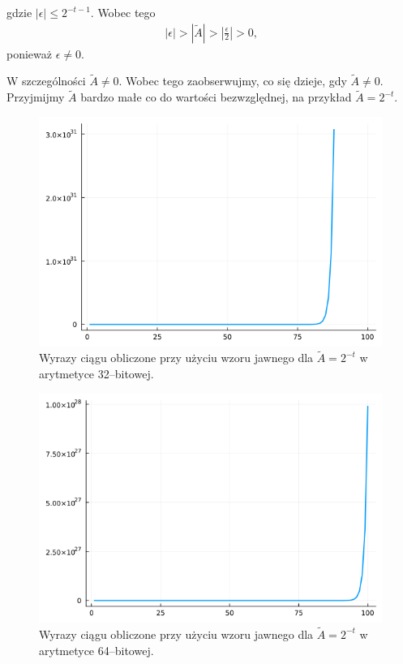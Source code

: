 \documentclass{article}
\begin{document}
\noindent gdzie \(|\epsilon| \leq 2^{-t-1}\). Wobec tego 
\begin{align*}
    \left| \epsilon \right| > \left| \tilde{A} \right|  > \left| \frac{\epsilon}{2} \right| > 0 \text{,}
\end{align*}
ponieważ \(\epsilon \neq 0 \).

\noindent W szczególności \(\tilde{A} \neq 0\). Wobec tego zaobserwujmy, co się dzieje, gdy \(\tilde{A} \neq 0\). Przyjmijmy \(\tilde{A}\) bardzo małe co do wartości bezwzględnej, na przykład \(\tilde{A} = 2^{-t}\).


\begin{figure}[!h]
    \centering
    \includegraphics[scale=0.4]{plot32_3.png}
    \caption{Wyrazy ciągu obliczone przy użyciu wzoru jawnego dla \(\tilde{A} = 2^{-t}\) w arytmetyce 32--bitowej.}
    \label{fig:plot32_3}
\end{figure}

\newpage

\begin{figure}[!h]
    \centering
    \includegraphics[scale=0.4]{plot64_3.png}
    \caption{Wyrazy ciągu obliczone przy użyciu wzoru jawnego dla \(\tilde{A} = 2^{-t}\) w arytmetyce 64--bitowej.}
    \label{fig:plot64_3}
\end{figure}
\end{document}
